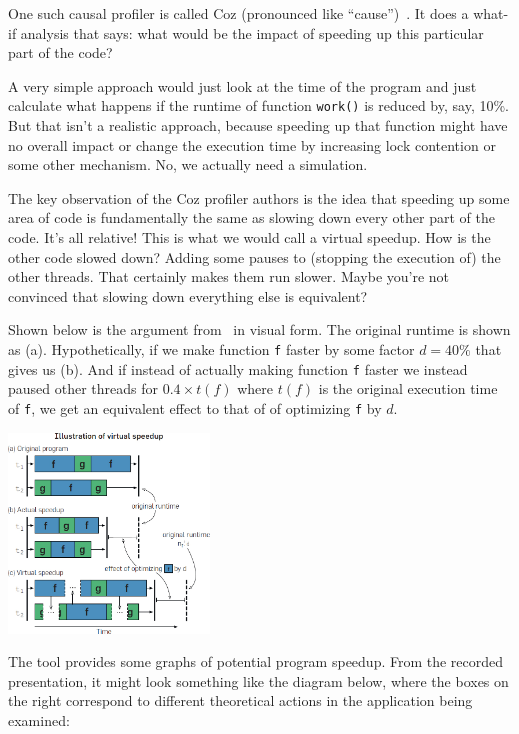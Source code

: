 \documentclass[a4paper]{report}
\begin{document}
One such causal profiler is called Coz (pronounced like ``cause'')~\cite{coz}. It does a what-if analysis that says: what would be the impact of speeding up this particular part of the code? 

A very simple approach would just look at the time of the program and just calculate what happens if the runtime of function \texttt{work()} is reduced by, say, 10\%. But that isn't a realistic approach, because speeding up that function might have no overall impact or change the execution time by increasing lock contention or some other mechanism. No, we actually need a simulation. 

The key observation of the Coz profiler authors is the idea that speeding up some area of code is fundamentally the same as slowing down every other part of the code. It's all relative! This is what we would call a virtual speedup. How is the other code slowed down? Adding some pauses to (stopping the execution of) the other threads. That certainly makes them run slower. Maybe you're not convinced that slowing down everything else is equivalent?


Shown below is the argument from~\cite{coz} in visual form. The original runtime is shown as (a). Hypothetically, if we make function \texttt{f} faster by some factor $d = 40\%$ that gives us (b). And if instead of actually making function \texttt{f} faster we instead paused other threads for $0.4 \times t(f)$ where $t(f)$ is the original execution time of \texttt{f}, we get an equivalent effect to that of of optimizing \texttt{f} by $d$.
\begin{center}
	\includegraphics[width=0.4\textwidth]{images/virtual-speedup.jpg}
\end{center}

The tool provides some graphs of potential program speedup. From the recorded presentation, it might look something like the diagram below, where the boxes on the right correspond to different theoretical actions in the application being examined:
\end{document}
